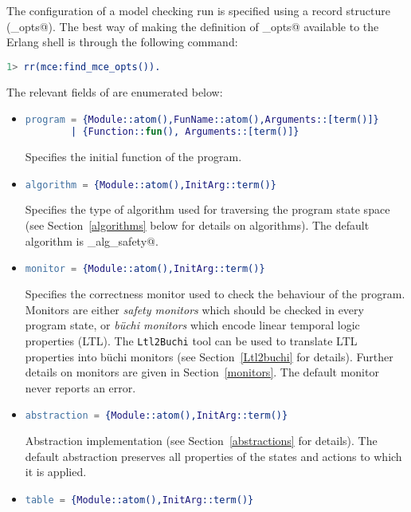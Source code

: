 \documentclass[a4paper]{article}
\begin{document}
The configuration of a model checking run is specified using
a record structure (\lstinline@mce_opts@).
The best way of making the definition of \lstinline@mce_opts@
available to the Erlang shell is through
the following command:
\begin{lstlisting}[language=Erlang]
1> rr(mce:find_mce_opts()).
\end{lstlisting}
The relevant fields of are enumerated below:
\begin{itemize}
\item
\begin{lstlisting}[language=Erlang]
program = {Module::atom(),FunName::atom(),Arguments::[term()]} 
        | {Function::fun(), Arguments::[term()]}
\end{lstlisting}
Specifies the initial function of the program.
\item
\begin{lstlisting}[language=Erlang]
algorithm = {Module::atom(),InitArg::term()}          
\end{lstlisting}
Specifies the type of algorithm used for
traversing the program state space
(see Section~\ref{algorithms} below for details on algorithms).
The default algorithm is \lstinline@mce_alg_safety@.
\item
\begin{lstlisting}[language=Erlang]
monitor = {Module::atom(),InitArg::term()}
\end{lstlisting}
Specifies the correctness monitor used to check
the behaviour of the program.
Monitors are either {\em safety monitors} which should
be checked in every program state,
or {\em b\"uchi monitors} which encode linear temporal logic properties (LTL).
The \texttt{Ltl2Buchi} tool can be used to translate
LTL properties into b\"uchi monitors (see Section~\ref{Ltl2buchi} for details).
Further details on monitors are given in Section~\ref{monitors}.
The default monitor never reports an error.
\item
\begin{lstlisting}[language=Erlang]
abstraction = {Module::atom(),InitArg::term()}       
\end{lstlisting}
Abstraction implementation (see Section~\ref{abstractions} for details).
The default abstraction preserves all properties of the states
and actions to which it is applied.
\item
\begin{lstlisting}[language=Erlang]
table = {Module::atom(),InitArg::term()}          
\end{lstlisting}

\end{itemize}
\end{document}
